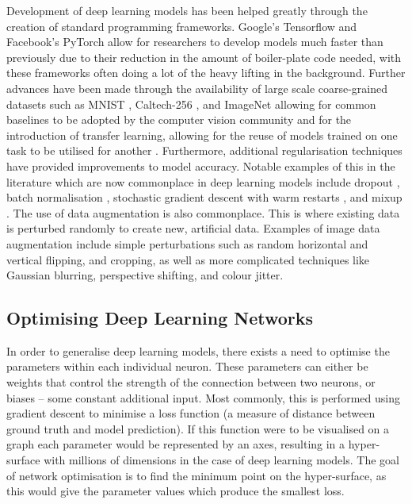 Development of deep learning models has been helped greatly through the creation of standard programming frameworks. Google's Tensorflow \cite{abadi_tensorflow:_2016} and Facebook's PyTorch \cite{paszke_automatic_2017} allow for researchers to develop models much faster than previously due to their reduction in the amount of boiler-plate code needed, with these frameworks often doing a lot of the heavy lifting in the background. Further advances have been made through the availability of large scale coarse-grained datasets such as MNIST \cite{lecun_gradient-based_1998}, Caltech-256 \cite{griffin_caltech-256_2007}, and ImageNet \cite{deng_imagenet:_2009} allowing for common baselines to be adopted by the computer vision community and for the introduction of transfer learning, allowing for the reuse of models trained on one task to be utilised for another \cite{pan_survey_2010}. Furthermore, additional regularisation techniques have provided improvements to model accuracy. Notable examples of this in the literature which are now commonplace in deep learning models include dropout \cite{srivastava_dropout:_2014}, batch normalisation \cite{ioffe_batch_2015}, stochastic gradient descent with warm restarts \cite{loshchilov_sgdr:_2016}, and mixup \cite{zhang_mixup:_2017}. The use of data augmentation is also commonplace. This is where existing data is perturbed randomly to create new, artificial data. Examples of image data augmentation include simple perturbations such as random horizontal and vertical flipping, and cropping, as well as more complicated techniques like Gaussian blurring, perspective shifting, and colour jitter.

\subsection{Optimising Deep Learning Networks}\label{ch:Background,sec:DLIntro,sub:stochasticgradientdescent}

In order to generalise deep learning models, there exists a need to optimise the parameters within each individual neuron. These parameters can either be weights that control the strength of the connection between two neurons, or biases -- some constant additional input. Most commonly, this is performed using gradient descent to minimise a loss function (a measure of distance between ground truth and model prediction). If this function were to be visualised on a graph each parameter would be represented by an axes, resulting in a hyper-surface with millions of dimensions in the case of deep learning models. The goal of network optimisation is to find the minimum point on the hyper-surface, as this would give the parameter values which produce the smallest loss. 

